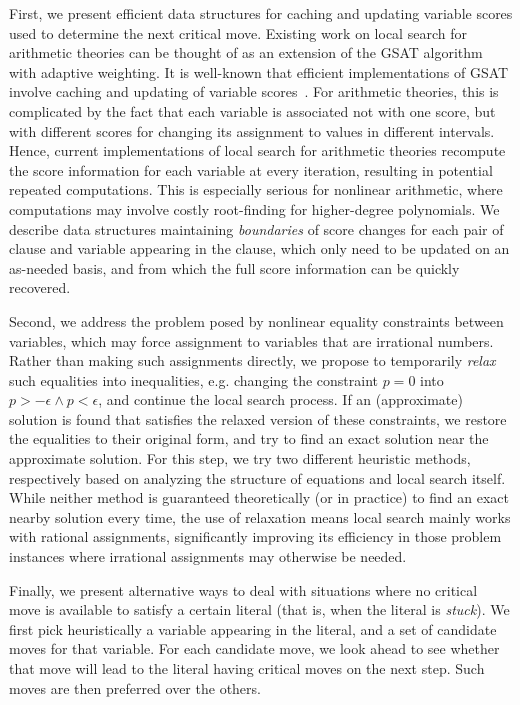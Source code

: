 \documentclass[runningheads]{llncs}
\begin{document}
First, we present efficient data structures for caching and updating variable scores used to determine the next critical move. Existing work on local search for arithmetic theories can be thought of as an extension of the GSAT algorithm~\cite{SelmanLM92} with adaptive weighting. It is well-known that efficient implementations of GSAT involve caching and updating of variable scores~\cite[Section 6.2]{HoosS2004}. For arithmetic theories, this is complicated by the fact that each variable is associated not with one score, but with different scores for changing its assignment to values in different intervals. Hence, current implementations of local search for arithmetic theories recompute the score information for each variable at every iteration, resulting in potential repeated computations. This is especially serious for nonlinear arithmetic, where computations may involve costly root-finding for higher-degree polynomials. We describe data structures maintaining \emph{boundaries} of score changes for each pair of clause and variable appearing in the clause, which only need to be updated on an as-needed basis, and from which the full score information can be quickly recovered.

Second, we address the problem posed by nonlinear equality constraints between variables, which may force assignment to variables that are irrational numbers. Rather than making such assignments directly, we propose to temporarily \emph{relax} such equalities into inequalities, e.g. changing the constraint $p=0$ into $p>-\epsilon \wedge p<\epsilon$, and continue the local search process. If an (approximate) solution is found that satisfies the relaxed version of these constraints, we restore the equalities to their original form, and try to find an exact solution near the approximate solution. For this step, we try two different heuristic methods, respectively based on analyzing the structure of equations and local search itself. While neither method is guaranteed theoretically (or in practice) to find an exact nearby solution every time, the use of relaxation means local search mainly works with rational assignments, significantly improving its efficiency in those problem instances where irrational assignments may otherwise be needed.

Finally, we present alternative ways to deal with situations where no critical move is available to satisfy a certain literal (that is, when the literal is \emph{stuck}). We first pick heuristically a variable appearing in the literal, and a set of candidate moves for that variable. For each candidate move, we look ahead to see whether that move will lead to the literal having critical moves on the next step. Such moves are then preferred over the others.
\end{document}
